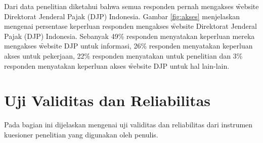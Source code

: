 \noindent
Dari data penelitian diketahui bahwa semua responden pernah mengakses \f{website} Direktorat Jenderal Pajak (DJP) Indonesia. Gambar \ref{fig:akses} menjelaskan mengenai persentase keperluan responden mengakses \f{website} Direktorat Jenderal Pajak (DJP) Indonesia. Sebanyak 49\% responden menyatakan keperluan mereka mengakses \f{website} DJP untuk informasi, 26\% responden menyatakan keperluan akses untuk pekerjaan, 22\% responden menyatakan untuk penelitian dan 3\% responden menyatakan keperluan akses \f{website} DJP untuk hal lain-lain.
\section{Uji Validitas dan Reliabilitas}
Pada bagian ini dijelaskan mengenai uji validitas dan reliabilitas dari instrumen kuesioner penelitian yang digunakan oleh penulis.
